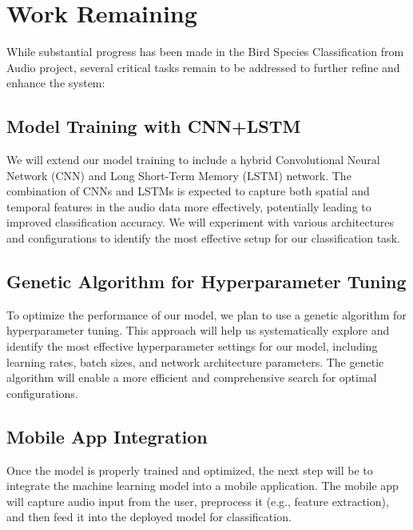 \newpage


\section{Work Remaining}
While substantial progress has been made in the Bird Species Classification
from Audio project, several critical tasks remain to be addressed to further refine and enhance the system:


\subsection{Model Training with CNN+LSTM}
We will extend our model training to include a hybrid Convolutional Neural Network (CNN) and Long Short-Term Memory (LSTM) network. The combination of CNNs and LSTMs is expected to capture both spatial and temporal features in the audio data more effectively, potentially leading to improved classification accuracy. We will experiment with various architectures and configurations to identify the most effective setup for our classification task.

\subsection{Genetic Algorithm for Hyperparameter Tuning}
To optimize the performance of our model, we plan to use a genetic algorithm for hyperparameter tuning. This approach will help us systematically explore and identify the most effective hyperparameter settings for our model, including learning rates, batch sizes, and network architecture parameters. The genetic algorithm will enable a more efficient and comprehensive search for optimal configurations.

\subsection{Mobile App Integration}
Once the model is properly trained and optimized, the next step will be to integrate the machine learning model into a mobile application. The mobile app will capture audio input from the user, preprocess it (e.g., feature extraction), and then feed it into the deployed model for classification.

